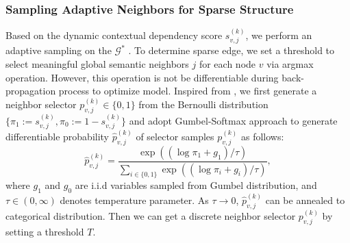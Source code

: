 \documentclass[letterpaper]{article} %
\begin{document}
\subsubsection{Sampling Adaptive Neighbors for Sparse Structure}
Based on the dynamic contextual dependency score $s_{v,j}^{(k)}$, we perform an adaptive sampling on the $\mathcal{G}^*$ . To determine sparse edge, we set a threshold to select meaningful global semantic neighbors $j$ for each node $v$ via argmax operation. However, this operation is not be differentiable during back-propagation process to optimize model. Inspired from \citet{jang2016categorical}, we first generate a neighbor selector $p_{v,j}^{(k)}\in\{0, 1\}$ from the Bernoulli distribution $\{\pi_1:=s_{v,j}^{(k)}, \pi_0:=1-s_{v,j}^{(k)}\}$ and adopt Gumbel-Softmax approach to generate differentiable probability $\hat{p}_{v,j}^{(k)}$ of selector samples ${p}_{v,j}^{(k)}$ as follows:
\begin{equation}
\hat{p}_{v,j}^{(k)} = \frac{\exp((\log{\pi_1}+g_1)/\tau)}{\sum_{i\in\{0,1\}}\exp((\log{\pi_i}+g_i)/\tau)},
\label{10}
\end{equation}
where $g_1$ and $g_0$ are i.i.d variables sampled from Gumbel distribution, and $\tau\in(0, \infty)$ denotes temperature parameter. As $\tau\to{0}$, $\hat{p}_{v,j}^{(k)}$ can be annealed to categorical distribution. Then we can get a discrete neighbor selector $p_{v,j}^{(k)}$ by setting a threshold $T$.
\end{document}
